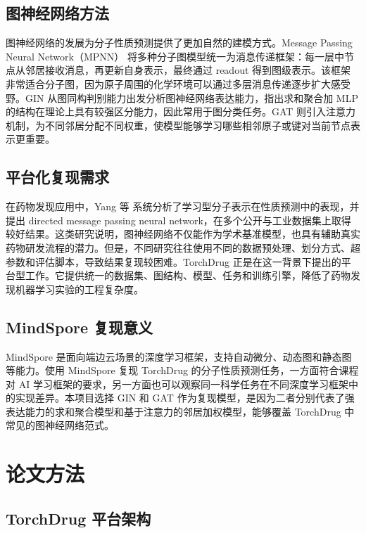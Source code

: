 \documentclass[12pt,hyperref,a4paper,UTF8]{ctexart}
\begin{document}
\subsection{图神经网络方法}

图神经网络的发展为分子性质预测提供了更加自然的建模方式。Message Passing Neural Network（MPNN）\cite{mpnn} 将多种分子图模型统一为消息传递框架：每一层中节点从邻居接收消息，再更新自身表示，最终通过 readout 得到图级表示。该框架非常适合分子图，因为原子周围的化学环境可以通过多层消息传递逐步扩大感受野。GIN\cite{gin} 从图同构判别能力出发分析图神经网络表达能力，指出求和聚合加 MLP 的结构在理论上具有较强区分能力，因此常用于图分类任务。GAT\cite{gat} 则引入注意力机制，为不同邻居分配不同权重，使模型能够学习哪些相邻原子或键对当前节点表示更重要。

\subsection{平台化复现需求}

在药物发现应用中，Yang 等\cite{dmpnn} 系统分析了学习型分子表示在性质预测中的表现，并提出 directed message passing neural network，在多个公开与工业数据集上取得较好结果。这类研究说明，图神经网络不仅能作为学术基准模型，也具有辅助真实药物研发流程的潜力。但是，不同研究往往使用不同的数据预处理、划分方式、超参数和评估脚本，导致结果复现较困难。TorchDrug\cite{torchdrug} 正是在这一背景下提出的平台型工作。它提供统一的数据集、图结构、模型、任务和训练引擎，降低了药物发现机器学习实验的工程复杂度。

\subsection{MindSpore 复现意义}

MindSpore 是面向端边云场景的深度学习框架，支持自动微分、动态图和静态图等能力。使用 MindSpore 复现 TorchDrug 的分子性质预测任务，一方面符合课程对 AI 学习框架的要求，另一方面也可以观察同一科学任务在不同深度学习框架中的实现差异。本项目选择 GIN 和 GAT 作为复现模型，是因为二者分别代表了强表达能力的求和聚合模型和基于注意力的邻居加权模型，能够覆盖 TorchDrug 中常见的图神经网络范式。

\section{论文方法}

\subsection{TorchDrug 平台架构}
\end{document}
